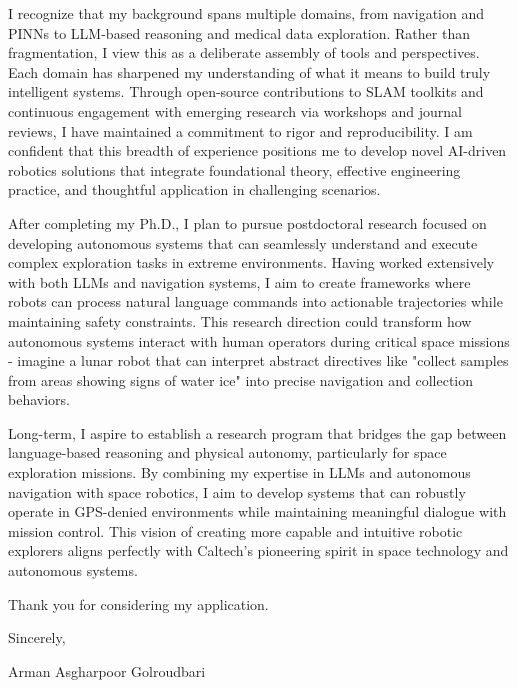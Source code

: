 \documentclass[a4,20pt]{article}
\begin{document}
\begin{large}
I recognize that my background spans multiple domains, from navigation and PINNs to LLM-based reasoning and medical data exploration. Rather than fragmentation, I view this as a deliberate assembly of tools and perspectives. Each domain has sharpened my understanding of what it means to build truly intelligent systems. Through open-source contributions to SLAM toolkits and continuous engagement with emerging research via workshops and journal reviews, I have maintained a commitment to rigor and reproducibility. I am confident that this breadth of experience positions me to develop novel AI-driven robotics solutions that integrate foundational theory, effective engineering practice, and thoughtful application in challenging scenarios.

After completing my Ph.D., I plan to pursue postdoctoral research focused on developing autonomous systems that can seamlessly understand and execute complex exploration tasks in extreme environments. Having worked extensively with both LLMs and navigation systems, I aim to create frameworks where robots can process natural language commands into actionable trajectories while maintaining safety constraints. This research direction could transform how autonomous systems interact with human operators during critical space missions - imagine a lunar robot that can interpret abstract directives like "collect samples from areas showing signs of water ice" into precise navigation and collection behaviors.

Long-term, I aspire to establish a research program that bridges the gap between language-based reasoning and physical autonomy, particularly for space exploration missions. By combining my expertise in LLMs and autonomous navigation with space robotics, I aim to develop systems that can robustly operate in GPS-denied environments while maintaining meaningful dialogue with mission control. This vision of creating more capable and intuitive robotic explorers aligns perfectly with Caltech's pioneering spirit in space technology and autonomous systems.







\vspace{0.05cm}
Thank you for considering my application.\vspace{-0.1cm}

Sincerely, \vspace{-0.1cm}

Arman Asgharpoor Golroudbari

\end{large}
\small


\end{document}
